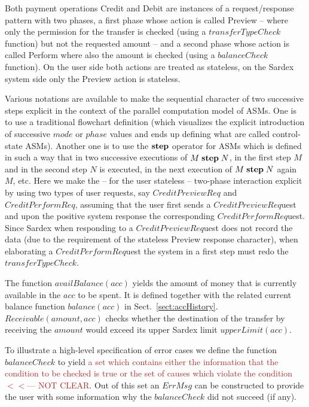Both payment operations Credit and Debit are instances of a request/response pattern with two phases, a first phase whose action is called Preview -- where only the permission for the transfer is checked (using a $transferTypeCheck$ function) but not the requested amount -- and  a second phase whose action is called Perform where also the amount is checked (using a $balanceCheck$ function). On the user side both actions are treated as stateless, on the Sardex system side only the Preview action is stateless. 

Various notations are available to make the sequential character of two successive steps explicit in the context of the parallel computation model of ASMs. One is to use a traditional flowchart definition (which visualizes the explicit introduction of successive $mode$ or $phase$ values and ends up defining what are called control-state ASMs). Another one is to use the $\mathrel{\mathbf{step}}$ operator for ASMs which is defined in such a way that in two successive executions of $M \mathrel{\mathbf{step}} N$, in the first step $M$ and in the second step $N$ is executed, in the next execution of  $M \mathrel{\mathbf{step}} N $ again $M$, etc. Here we make the -- for the user stateless -- two-phase interaction explicit by using two  types of user requests, say $CreditPreviewReq$ and $CreditPerformReq$, assuming that the user first sends a $CreditPreviewReq$uest and upon the positive system response the corresponding $CreditPerformReq$uest. Since Sardex when responding to a $CreditPreviewReq$uest does not record the data (due to the requirement of the stateless Preview response character), when elaborating a $CreditPerformReq$uest the system in a first step must redo the $transferTypeCheck$. 

The function $availBalance(acc)$ yields the amount of money that is currently available in the $acc$ to be spent. It is defined together with the related current balance function $balance(acc)$ in Sect.~\ref{sect:accHistory}. $Receivable(amount,acc)$ checks whether the destination of the transfer by receiving the $amount$ would exceed its upper Sardex limit $upperLimit(acc)$.

To illustrate a high-level specification of error cases we define the function $balanceCheck$ to yield \textcolor{brown}{a set which contains either the information that the condition to be checked is true or the set of causes which violate the condition $<<$--- NOT CLEAR}. Out of this set an $ErrMsg$ can be constructed to provide the user with some information why the $balanceCheck$ did not succeed (if any). 

